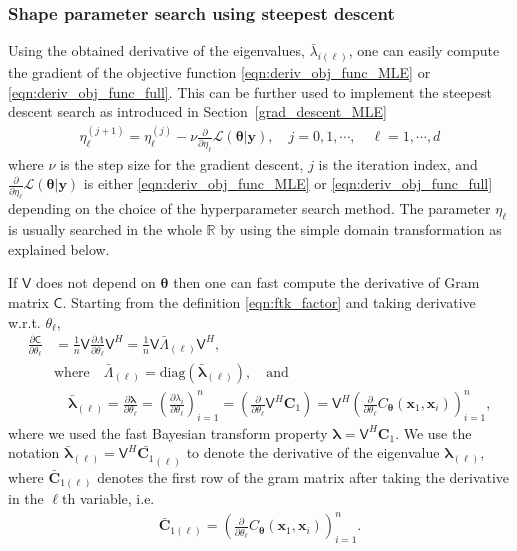 \documentclass{svjour3}                     %
\newcommand{\bm}[1]{\boldsymbol{#1}}
\newcommand{\reals}{\mathbb{R}}
\newcommand{\vlambda}{{\bm{\lambda}}}
\newcommand{\vtheta}{{\bm{\theta}}}
\newcommand{\vC}{\bm{C}}
\newcommand{\vx}{\bm{x}}
\newcommand{\vy}{\bm{y}}
\newcommand{\mC}{\mathsf{C}}
\newcommand{\mLambda}{\mathsf{\Lambda}}
\newcommand{\mV}{\mathsf{V}}
\newcommand{\diag}{\text{diag}}
\newcommand\secref{Section~\ref}
\begin{document}
\subsubsection{Shape parameter search using steepest descent}
Using the obtained derivative of the eigenvalues, $\bar{\lambda}_{i(\ell)}$, one can easily compute the gradient of the objective function \eqref{eqn:deriv_obj_func_MLE} or \eqref{eqn:deriv_obj_func_full}. This can be further used to implement the steepest descent search as introduced in \secref{grad_descent_MLE} 
\begin{align*}
\eta^{(j+1)}_\ell = \eta^{(j)}_\ell - \nu \frac{\partial}{\partial \eta_\ell} \mathcal{L}(\vtheta | \vy), \quad j=0,1,\cdots,  \quad \ell = 1, \cdots, d
\end{align*}
where $\nu$ is the step size for the gradient descent, $j$ is the iteration index, and $\frac{\partial}{\partial \eta_\ell} \mathcal{L}(\vtheta | \vy)$ is either \eqref{eqn:deriv_obj_func_MLE} or \eqref{eqn:deriv_obj_func_full} depending on the choice of the hyperparameter search method. The parameter $\eta_\ell$ is usually searched in the whole $\reals$ by using the simple domain transformation as explained below. %


If $\mV$ does not depend on $\vtheta$ then one can fast compute the derivative of Gram matrix $\mC$. Starting from the definition \eqref{eqn:ftk_factor} and taking derivative w.r.t. $\theta_\ell$, 
\begin{align}
\nonumber
\displaystyle \frac{\partial \mC}{\partial \theta_\ell} 
& = \frac 1n \mV \frac{\partial {\mLambda}}{\partial \theta_\ell} \mV^H
= \frac 1n \mV \bar{\mLambda}_{(\ell)} \mV^H,
\\
\nonumber
& \text{where} \quad \bar{\mLambda}_{(\ell)} = \diag(\bar{\vlambda}_{(\ell)}), \quad \text{and}
\\
\label{eqn:deriv_eigenval_gram_matrix}
&  \quad \bar{\vlambda}_{(\ell)} = \frac{\partial \vlambda}{\partial \theta_\ell} = \left( \frac{\partial \lambda_i}{\partial \theta_\ell} \right)_{i=1}^n 
= \left( \frac{\partial }{\partial \theta_\ell} \mV^H {\vC_1} \right)
= \mV^H \left( \frac{\partial }{\partial \theta_\ell} {C_\vtheta(\vx_1,\vx_i)} \right)_{i=1}^n,
\end{align}
where we used the fast Bayesian transform property $\vlambda 
= \mV^H \vC_1$. %
We use the notation $\bar{\vlambda}_{(\ell)} = \mV^H \bar{\vC_1}_{(\ell)}$ to denote the derivative of the eigenvalue ${\vlambda}_{(\ell)}$,  where $\bar{\vC}_{1(\ell)}$ denotes the first row of the gram matrix after taking the derivative in the $\ell$th variable, i.e.
\begin{align*}
\bar{\vC}_{1{(\ell)}} = \left(\frac{\partial }{\partial{\theta}_\ell} C_\vtheta(\vx_1,\vx_i) \right)_{i=1}^n.
\end{align*}
\end{document}
